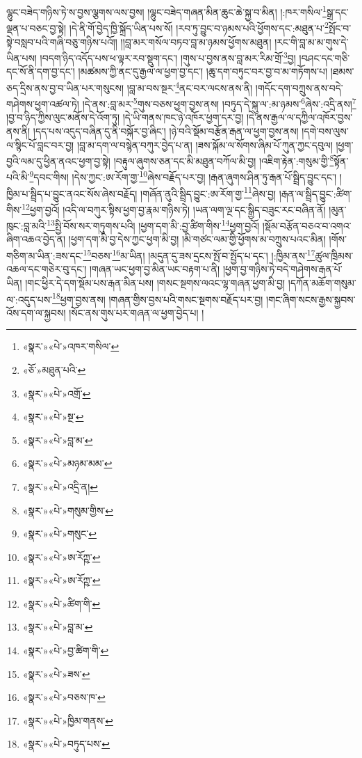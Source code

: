 ལྷུང་བཟེད་གཉིས་ཏེ་ས་བྱས་ལྕགས་ལས་བྱས། །ལྷུང་བཟེད་གཞན་མིན་ཆུང་ཆེ་སྐྱ་བ་མིན། །:ཁར་གསིལ་\footnote{«སྣར་»«པེ་»འཁར་གསིལ་}སྒྲ་དང་ལྡན་པ་བཅང་བྱ་སྟེ། །དེ་ནི་གོ་བྱེད་ཁྱི་སྐྲོད་ཡིན་པས་སོ། །རབ་ཏུ་བྱུང་བ་ཉམས་པའི་ཕྱོགས་དང་:མཐུན་པ་\footnote{«ཅོ་»མཐུན་པའི་}སྤོང་བ་སྟེ་བསླབ་པའི་གཞི་བཅུ་གཉིས་པའོ།། །།བླ་མར་གསོལ་བཏབ་བླ་མ་ཉམས་ཕྱོགས་མཐུན། །རང་གི་བླ་མ་མ་གུས་དེ་ཡིན་པས། །བདག་ཉིད་འདོད་པས་ཕ་ལྟར་རབ་སྡུག་དང་། །གུས་པ་བྱས་ནས་བླ་མར་རིམ་གྲོ་\footnote{«སྣར་»«པེ་»འགྲོ་}བྱ། །བཤང་དང་གཅི་དང་སོ་ནི་དག་བྱ་དང་། །མཚམས་ཀྱི་ནང་དུ་རྒྱལ་ལ་ཕྱག་བྱ་དང་། །ཆུ་དག་བཏུང་བར་བྱ་བ་མ་གཏོགས་པ། །ཐམས་ཅད་དྲིས་ནས་བྱ་བ་ཡིན་པར་གསུངས། །བླ་མ་བས་སྔར་\footnote{«སྣར་»«པེ་»སྔ་}ནང་བར་ལངས་ནས་ནི། །གདོང་དག་བཀྲུས་ནས་བདེ་གཤེགས་ཕྱག་འཚལ་ཏེ། །དེ་ནས་:བླ་མར་\footnote{«སྣར་»«པེ་»བླ་མ་}གུས་བཅས་ཕྱག་བྱས་ནས། །བཏུད་དེ་སྐུ་ལ་:མ་ཉམས་\footnote{«སྣར་»«པེ་»མཉམ་མམ་}ཞེས་:འདྲི་ནས།\footnote{«སྣར་»«པེ་»འདྲི་ན།} །བྱ་བ་ཉིད་ཀྱིས་ལུང་མནོས་དེ་འོག་ཏུ། །དེ་ཡི་གནས་ཁང་ཉེ་འཁོར་ཕྱག་དར་བྱ། །དེ་ནས་རྒྱལ་ལ་དཀྱིལ་འཁོར་བྱས་ནས་ནི། །དད་པས་འདུད་བཞིན་དུ་ནི་བསྐོར་བྱ་ཞིང་། །ཉེ་བའི་སྡོམ་བརྩོན་རྒན་ལ་ཕྱག་བྱས་ནས། །དགེ་བས་ལུས་ལ་སྙིང་པོ་བླང་བར་བྱ། །བླ་མ་དག་ལ་བསྙེན་བཀུར་བྱེད་པ་ན། །ཟས་སྐོམ་ལ་སོགས་ཞིམ་པོ་ཀུན་ཀྱང་དབུལ། །ཕྱག་བྱའི་ལམ་དུ་ཕྱིན་ནའང་ཕྱག་བྱ་སྟེ། །བརྟུལ་ཞུགས་ཅན་དང་མི་མཐུན་བཀོལ་མི་བྱ། །འཇིག་རྟེན་:གསུམ་གྱི་\footnote{«སྣར་»«པེ་»གསུམ་གྱིས་}སྟོན་པའི་མི་\footnote{«སྣར་»«པེ་»གསུང་}དབང་གིས། །དེས་ཀྱང་:ཨ་རོག་གྱ་\footnote{«སྣར་»«པེ་»ཨ་རོཀྵ་}ཞེས་བརྗོད་པར་བྱ། །རྒན་ཞུགས་ཤིན་ཏུ་རྒན་པོ་སྦྲིད་བྱུང་དང་། །ཁྱིམ་པ་སྦྲིད་པ་བྱུང་ནའང་སོས་ཞེས་བརྗོད། །གཞོན་ནུའི་སྦྲིད་བྱུང་:ཨ་རོག་གྱ་\footnote{«སྣར་»«པེ་»ཨ་རོཀྵ་}ཞེས་བྱ། །རྒན་ལ་སྦྲིད་བྱུང་:ཚིག་གིས་\footnote{«སྣར་»«པེ་»ཚིག་གི་}ཕྱག་བྱའོ། །འདི་ལ་བཀུར་སྟིས་ཕྱག་བྱ་རྣམ་གཉིས་ཏེ། །ཡན་ལག་ལྔ་དང་སྒྱིད་བཟུང་རང་བཞིན་ནོ། །མུན་ཁུང་:བླ་མའི་\footnote{«སྣར་»«པེ་»བླ་མ་}སྤྱི་བོས་སར་གཏུགས་པའི། །ཕྱག་དག་མི་:བྱ་ཚིག་གིས་\footnote{«སྣར་»«པེ་»བྱ་ཚིག་གི་}ཕྱག་བྱའོ། །སྡོམ་བརྩོན་བཅའ་བ་འགའ་ཞིག་འཆའ་བྱེད་ན། །ཕྱག་དག་མི་བྱ་དེས་ཀྱང་ཕྱག་མི་བྱ། །མི་གཙང་ལམ་གྱི་ཕྱོགས་མ་བཀྲུས་པའང་མིན། །གོས་གཅིག་མ་ཡིན་:ཟས་དང་\footnote{«སྣར་»«པེ་»ཟས་}བཅས་\footnote{«སྣར་»«པེ་»བཅས་ཁ་}མ་ཡིན། །མདུན་དུ་ཟས་དྲངས་སྤོ་བ་སྤྱོད་པ་དང་། །:ཁྱིམ་ནས་\footnote{«སྣར་»«པེ་»ཁྱིམ་གནས་}ཚུལ་ཁྲིམས་འཆལ་དང་གཅེར་བུ་དང་། །གཞན་ཡང་ཕྱག་བྱ་མིན་ཡང་བརྟག་པ་ནི། །ཕྱག་བྱ་གཉིས་ཏེ་བདེ་གཤེགས་རྒན་པོ་ཡིན། །གང་ཕྱིར་དེ་དག་སྡོམ་པས་རྒན་མིན་པས། །གསང་སྔགས་ལའང་ལྷ་གཞན་ཕྱག་མི་བྱ། །དཀོན་མཆོག་གསུམ་ལ་:འདུད་པས་\footnote{«སྣར་»«པེ་»བཏུད་པས་}ཕྱག་བྱས་ནས། །གཞན་གྱིས་བྱས་པའི་གསང་སྔགས་བརྗོད་པར་བྱ། །གང་ཞིག་སངས་རྒྱས་སྐྱབས་འོས་དག་ལ་སྐྱབས། །སོང་ནས་གུས་པར་གཞན་ལ་ཕྱག་བྱེད་པ། །
